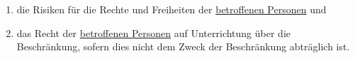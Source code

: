 \begin{enumerate}
\begin{enumerate}
    \item die Risiken für die Rechte und Freiheiten der \hyperref[itm:04-1]{betroffenen Personen} und%
    \label{itm:23-2g}

    \item das Recht der \hyperref[itm:04-1]{betroffenen Personen} auf Unterrichtung über die Beschränkung, sofern dies
     nicht dem Zweck der Beschränkung abträglich ist.%
    \label{itm:23-2h}

  \end{enumerate}

\end{enumerate}


